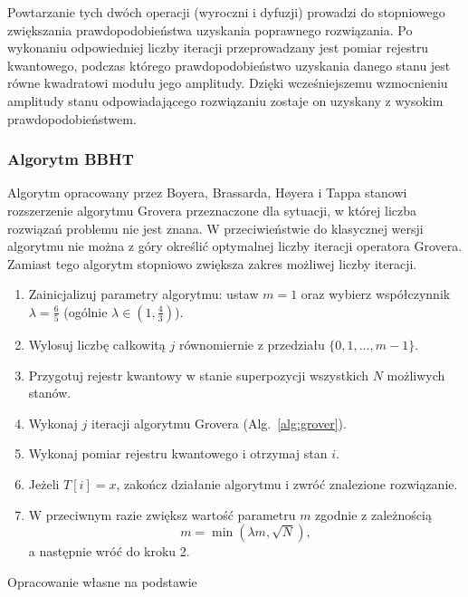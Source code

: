 Powtarzanie tych dwóch operacji (wyroczni i dyfuzji) prowadzi do stopniowego zwiększania prawdopodobieństwa uzyskania poprawnego rozwiązania. Po wykonaniu odpowiedniej liczby iteracji przeprowadzany jest pomiar rejestru kwantowego, podczas którego prawdopodobieństwo uzyskania danego stanu jest równe kwadratowi modułu jego amplitudy. Dzięki wcześniejszemu wzmocnieniu amplitudy stanu odpowiadającego rozwiązaniu zostaje on uzyskany z wysokim prawdopodobieństwem.

\subsubsection{Algorytm BBHT}
Algorytm opracowany przez Boyera, Brassarda, Høyera i Tappa stanowi rozszerzenie algorytmu Grovera przeznaczone dla sytuacji, w której liczba rozwiązań problemu nie jest znana. W przeciwieństwie do klasycznej wersji algorytmu nie można z góry określić optymalnej liczby iteracji operatora Grovera. Zamiast tego algorytm stopniowo zwiększa zakres możliwej liczby iteracji.\cite{bbht1996}

\begin{algorithm}[H]
\caption{Algorytm BBHT}
\label{alg:bbht}
\begin{enumerate}

    \item Zainicjalizuj parametry algorytmu: ustaw $m=1$ oraz wybierz
    współczynnik $\lambda=\frac{6}{5}$ 
    (ogólnie $\lambda \in (1,\frac{4}{3})$).

    \item Wylosuj liczbę całkowitą $j$ równomiernie z przedziału
    $\{0,1,\dots,m-1\}$.

    \item Przygotuj rejestr kwantowy w stanie superpozycji wszystkich
    $N$ możliwych stanów.

    \item Wykonaj $j$ iteracji algorytmu Grovera (Alg.~\ref{alg:grover}).

    \item Wykonaj pomiar rejestru kwantowego i otrzymaj stan $i$.

    \item Jeżeli $T[i]=x$, zakończ działanie algorytmu i zwróć
    znalezione rozwiązanie.

    \item W przeciwnym razie zwiększ wartość parametru $m$ zgodnie
    z zależnością
    \[
        m=\min(\lambda m,\sqrt{N}),
    \]
    a następnie wróć do kroku 2.

\end{enumerate}
\begin{center}
\small Opracowanie własne na podstawie \cite{bbht1996}
\end{center}
\end{algorithm}

